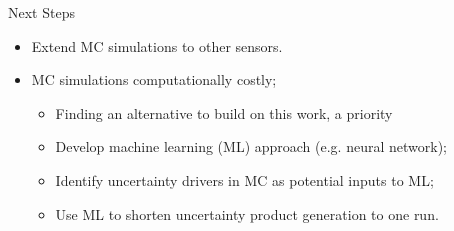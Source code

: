 \documentclass[final]{beamer}
\newlength{\sepwid}
\newlength{\onecolwid}
\newlength{\twocolwid}
\begin{document}
\begin{frame}[t]
\begin{columns}[t]
\begin{column}{\twocolwid}
\begin{columns}[t,totalwidth=\twocolwid] %
\begin{column}{\onecolwid} %







\end{column} %

\end{columns} %

\end{column} %


\begin{column}{\onecolwid} %


\begin{block}{Next Steps}
\begin{itemize}
\item Extend MC simulations to other sensors.
\item MC simulations computationally costly;
	\begin{itemize}
	\item Finding an alternative to build on this work, a priority
	\item Develop machine learning (ML) approach (e.g. neural network);
	\item Identify uncertainty drivers in MC as potential inputs to ML;
 	\item Use ML to shorten uncertainty product generation to one run. 
	\end{itemize}
\end{itemize}

\end{block}




\end{column}
\end{columns}
\end{frame}
\end{document}
